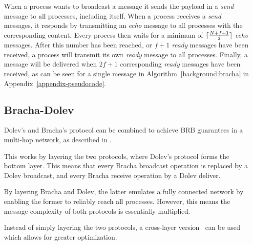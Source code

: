 When a process wants to broadcast a message it sends the payload in a \textit{send} message to all processes, including itself. When a process receives a \textit{send} messages, it responds by transmitting an \textit{echo} message to all processes with the corresponding content. Every process then waits for a minimum of $\lceil\frac{N+f+1}{2}\rceil$ \textit{echo} messages. 
After this number has been reached, or $f+1$ \textit{ready} messages have been received, a process will transmit its own \textit{ready} message to all processes. Finally, a message will be delivered when $2f+1$ corresponding \textit{ready} messages have been received, as can be seen for a single message in Algorithm~\ref{background:bracha} in Appendix~\ref{appendix-pseudocode}.

\subsection*{Bracha-Dolev}
Dolev's and Bracha's protocol can be combined to achieve BRB guarantees in a multi-hop network, as described in \cite{bracha-dolev}. 

This works by layering the two protocols, where Dolev's protocol forms the bottom layer. This means that every Bracha broadcast operation is replaced by a Dolev broadcast, and every Bracha receive operation by a Dolev deliver. %

By layering Bracha and Dolev, the latter emulates a fully connected network by enabling the former to reliably reach all processes. However, this means the message complexity of both protocols %
is essentially multiplied.

Instead of simply layering the two protocols, a cross-layer version~\cite{bonomi2021practical} can be used which allows for greater optimization. 

